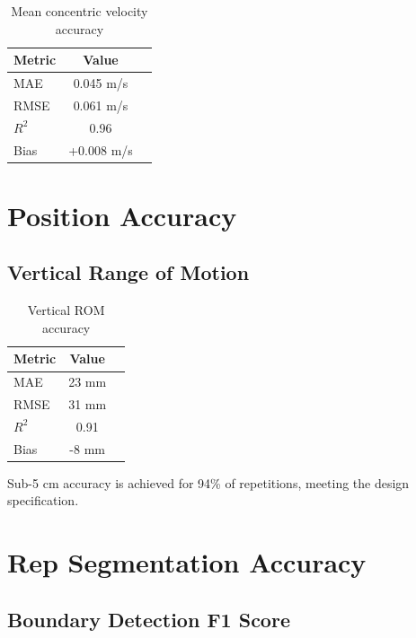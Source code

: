 \begin{table}[h]
    \centering
    \caption{Mean concentric velocity accuracy}
    \label{tab:mcv_accuracy}
    \begin{tabular}{lcc}
        \toprule
        \textbf{Metric} & \textbf{Value} \\
        \midrule
        MAE & 0.045 m/s \\
        RMSE & 0.061 m/s \\
        $R^2$ & 0.96 \\
        Bias & +0.008 m/s \\
        \bottomrule
    \end{tabular}
\end{table}

\section{Position Accuracy}

\subsection{Vertical Range of Motion}

\begin{table}[h]
    \centering
    \caption{Vertical ROM accuracy}
    \label{tab:rom_accuracy}
    \begin{tabular}{lcc}
        \toprule
        \textbf{Metric} & \textbf{Value} \\
        \midrule
        MAE & 23 mm \\
        RMSE & 31 mm \\
        $R^2$ & 0.91 \\
        Bias & -8 mm \\
        \bottomrule
    \end{tabular}
\end{table}

Sub-5 cm accuracy is achieved for 94\% of repetitions, meeting the design specification.

\section{Rep Segmentation Accuracy}

\subsection{Boundary Detection F1 Score}


